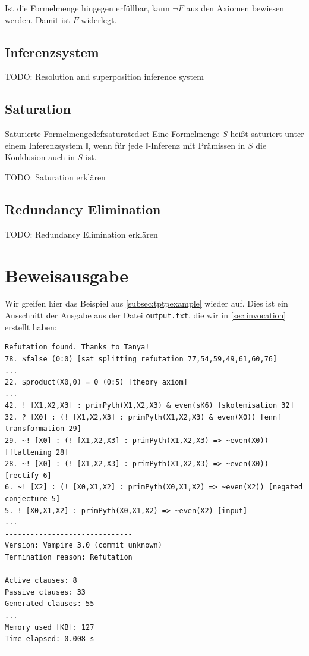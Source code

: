\documentclass{article}
\begin{document}
Ist die Formelmenge hingegen erfüllbar, kann $\neg F$ aus den Axiomen bewiesen werden.
Damit ist $F$ widerlegt. \cite[S. 7]{cav2013}

\subsection{Inferenzsystem}
\label{subsec:inference}
TODO: Resolution and superposition inference system

\subsection{Saturation}
\label{subsec:saturation}


\begin{definition}{Saturierte Formelmenge}{def:saturatedset}
	Eine Formelmenge $S$ heißt saturiert unter einem Inferenzsystem $\mathds{I}$, wenn für jede $\mathds{I}$-Inferenz mit Prämissen in $S$ die Konklusion auch in $S$ ist.
\end{definition}

TODO: Saturation erklären

\subsection{Redundancy Elimination}
\label{subsec:redund}

TODO: Redundancy Elimination erklären

\section{Beweisausgabe}
\label{sec:output}
Wir greifen hier das Beispiel aus \ref{subsec:tptpexample} wieder auf.
Dies ist ein Ausschnitt der Ausgabe aus der Datei \verb|output.txt|, die wir in \ref{sec:invocation}
erstellt haben:

\begin{verbatim}
Refutation found. Thanks to Tanya!
78. $false (0:0) [sat splitting refutation 77,54,59,49,61,60,76]
...
22. $product(X0,0) = 0 (0:5) [theory axiom]
...
42. ! [X1,X2,X3] : primPyth(X1,X2,X3) & even(sK6) [skolemisation 32]
32. ? [X0] : (! [X1,X2,X3] : primPyth(X1,X2,X3) & even(X0)) [ennf transformation 29]
29. ~! [X0] : (! [X1,X2,X3] : primPyth(X1,X2,X3) => ~even(X0)) [flattening 28]
28. ~! [X0] : (! [X1,X2,X3] : primPyth(X1,X2,X3) => ~even(X0)) [rectify 6]
6. ~! [X2] : (! [X0,X1,X2] : primPyth(X0,X1,X2) => ~even(X2)) [negated conjecture 5]
5. ! [X0,X1,X2] : primPyth(X0,X1,X2) => ~even(X2) [input]
...
------------------------------
Version: Vampire 3.0 (commit unknown)
Termination reason: Refutation

Active clauses: 8
Passive clauses: 33
Generated clauses: 55
...
Memory used [KB]: 127
Time elapsed: 0.008 s
------------------------------
\end{verbatim}
\end{document}
